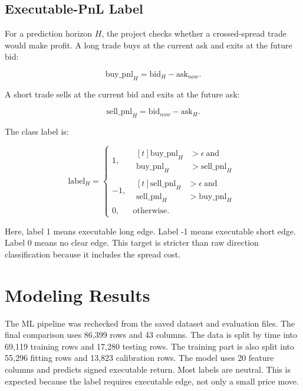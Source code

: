 \documentclass[conference]{../IEEEtran/IEEEtran}
\begin{document}
\subsection{Executable-PnL Label}

For a prediction horizon $H$, the project checks whether a crossed-spread trade would make profit. A long trade buys at the current ask and exits at the future bid:

\begin{equation}
    \mathrm{buy\_pnl}_H = \mathrm{bid}_{H} - \mathrm{ask}_{now}.
\end{equation}

A short trade sells at the current bid and exits at the future ask:

\begin{equation}
    \mathrm{sell\_pnl}_H = \mathrm{bid}_{now} - \mathrm{ask}_{H}.
\end{equation}

The class label is:

\begin{equation}
    \mathrm{label}_H =
    \begin{cases}
        1,  &
        \begin{aligned}[t]
            \mathrm{buy\_pnl}_H  &> \epsilon \ \mathrm{and} \\
            \mathrm{buy\_pnl}_H  &> \mathrm{sell\_pnl}_H
        \end{aligned} \\
        -1, &
        \begin{aligned}[t]
            \mathrm{sell\_pnl}_H &> \epsilon \ \mathrm{and} \\
            \mathrm{sell\_pnl}_H &> \mathrm{buy\_pnl}_H
        \end{aligned} \\
        0,  & \mathrm{otherwise}.
    \end{cases}
\end{equation}

Here, label 1 means executable long edge. Label -1 means executable short edge. Label 0 means no clear edge. This target is stricter than raw direction classification because it includes the spread cost.

\section{Modeling Results}

The ML pipeline was rechecked from the saved dataset and evaluation files. The final comparison uses 86,399 rows and 43 columns. The data is split by time into 69,119 training rows and 17,280 testing rows. The training part is also split into 55,296 fitting rows and 13,823 calibration rows. The model uses 20 feature columns and predicts signed executable return. Most labels are neutral. This is expected because the label requires executable edge, not only a small price move.
\end{document}
